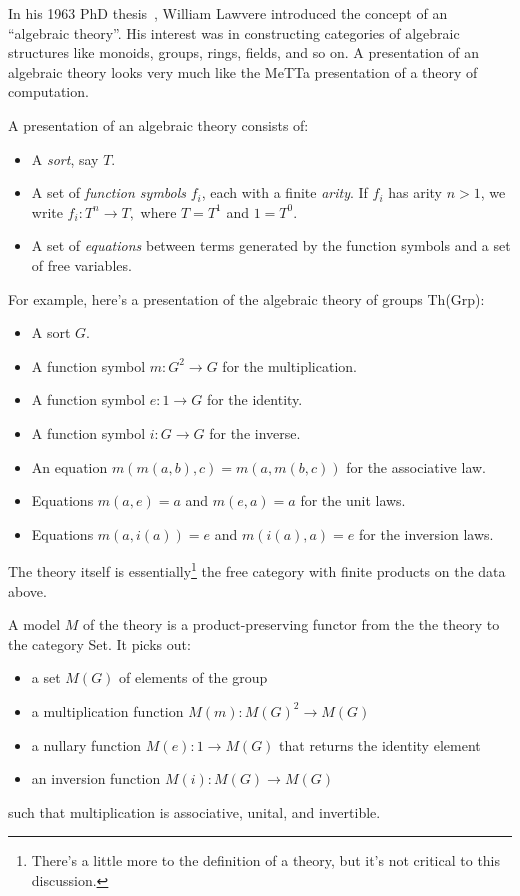 \documentclass{article}
\begin{document}
In his 1963 PhD thesis~\cite{Lawvere1963}, William Lawvere introduced the concept of an ``algebraic theory''.  His interest was in constructing categories of algebraic structures like monoids, groups, rings, fields, and so on.  A presentation of an algebraic theory looks very much like the MeTTa presentation of a theory of computation.

A presentation of an algebraic theory consists of:
\begin{itemize}
    \item A {\em sort}, say $T.$
    \item A set of {\em function symbols} $f_i$, each with a finite {\em arity}.  If $f_i$ has arity $n > 1$, we write $f_i:T^n \to T,$ where $T = T^1$ and $1 = T^0.$
    \item A set of {\em equations} between terms generated by the function symbols and a set of free variables.
\end{itemize}
For example, here's a presentation of the algebraic theory of groups Th(Grp):
\begin{itemize}
    \item A sort $G.$
    \item A function symbol $m\colon G^2 \to G$ for the multiplication.
    \item A function symbol $e\colon 1 \to G$ for the identity.
    \item A function symbol $i\colon G \to G$ for the inverse.
    \item An equation $m(m(a,b),c) = m(a, m(b,c))$ for the associative law.
    \item Equations $m(a, e) = a$ and $m(e, a) = a$ for the unit laws.
    \item Equations $m(a, i(a)) = e$ and $m(i(a), a) = e$ for the inversion laws.
\end{itemize}
The theory itself is essentially\footnote{There's a little more to the definition of a theory, but it's not critical to this discussion.} the free category with finite products on the data above.

A model $M$ of the theory is a product-preserving functor from the the theory to the category Set.  It picks out:
\begin{itemize}
    \item a set $M(G)$ of elements of the group
    \item a multiplication function $M(m)\colon M(G)^2 \to M(G)$
    \item a nullary function $M(e): 1 \to M(G)$ that returns the identity element
    \item an inversion function $M(i): M(G) \to M(G)$
\end{itemize}
such that multiplication is associative, unital, and invertible.
\end{document}

